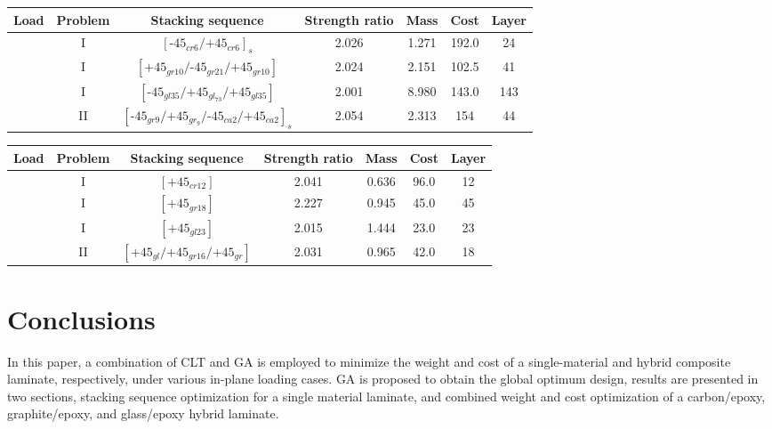 \documentclass[smallextended]{svjour3}       %
\begin{document}
\begin{tabular}{ccccccc}
	\toprule
	Load                                                        &Problem& Stacking sequence                                & Strength ratio  & Mass &  Cost   & Layer    \\
	\midrule
	       &       I                &  $[\text{-}45_{cr6}/\text{+}45_{cr6}]_s$                        & 2.026           & 1.271 &  192.0  & 24  \\
																&       I                &  $[\text{+}45_{gr10}/\text{-}45_{gr21}/\text{+}45_{gr10}]$            & 2.024           & 2.151 &  102.5  & 41  \\
																&       I                &  $[\text{-}45_{gl35}/\text{+}45_{gl_73}/\text{+}45_{gl35}]$            & 2.001           & 8.980 &  143.0  & 143  \\
																&       II                &
	$[\text{-}45_{gr9}/\text{+}45_{gr_9}/\text{-}45_{ca2}/\text{+}45_{ca2}]_s$            & 2.054         & 2.313 &
																		  154& 44  \\
	\bottomrule
\end{tabular}

\begin{tabular}{ccccccc}
	\toprule
	Load                                                    &   Problem          & Stacking sequence                          & Strength ratio  & Mass &  Cost   & Layer    \\
	\midrule
	  &      I   &  $[\text{+}45_{cr12}]$                            & 2.041           & 0.636 &  96.0  & 12  \\
													    						  &      I   &  $[\text{+}45_{gr18}]$                            & 2.227           & 0.945 &  45.0  & 45  \\
			 &  I                  &  $[\text{+}45_{gl23}]$                            & 2.015           & 1.444 &  23.0  & 23  \\
			 &  II                 &  $[\text{+}45_{gl}/\text{+}45_{gr16}/\text{+}45_{gr}]$          & 2.031           & 0.965 &  42.0  & 18 \\
	\bottomrule
\end{tabular}




\section{Conclusions}
In this paper, a combination of CLT and GA is employed to minimize the weight
and cost of a single-material and hybrid composite laminate, respectively,
under various in-plane loading cases. GA is proposed to obtain the global
optimum design, results are presented in two sections, stacking sequence
optimization for a single material laminate, and combined weight and cost
optimization of a carbon/epoxy, graphite/epoxy, and glass/epoxy hybrid
laminate.
\end{document}
